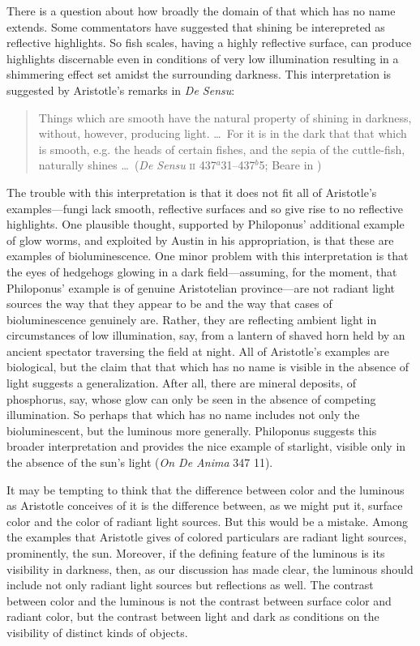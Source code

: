 There is a question about how broadly the domain of that which has no name extends. Some commentators have suggested that shining be interepreted as reflective highlights. So fish scales, having a highly reflective surface, can produce highlights discernable even in conditions of very low illumination resulting in a shimmering effect set amidst the surrounding darkness. This interpretation is suggested by Aristotle's remarks in \emph{De Sensu}: 
\begin{quote}
	Things which are smooth have the natural property of shining in darkness, without, however, producing light. \ldots\ For it is in the dark that that which is smooth, e.g. the heads of certain fishes, and the sepia of the cuttle-fish, naturally shines \ldots\ (\emph{De Sensu} \textsc{ii} 437\( ^{a} \)31--437\( ^{b} \)5; Beare in \citealt[4]{Barnes:1984uq})
\end{quote}
The trouble with this interpretation is that it does not fit all of Aristotle's examples---fungi lack smooth, reflective surfaces and so give rise to no reflective highlights. One plausible thought, supported by Philoponus' additional example of glow worms, and exploited by Austin in his appropriation, is that these are examples of bioluminescence. One minor problem with this interpretation is that the eyes of hedgehogs glowing in a dark field---assuming, for the moment, that Philoponus' example is of genuine Aristotelian province---are not radiant light sources the way that they appear to be and the way that cases of  bioluminescence genuinely are. Rather, they are reflecting ambient light in circumstances of low illumination, say, from a lantern of shaved horn held by an ancient spectator traversing the field at night. All of Aristotle's examples are biological, but the claim that that which has no name is visible in the absence of light suggests a generalization. After all, there are mineral deposits, of phosphorus, say, whose glow can only be seen in the absence of competing illumination. So perhaps that which has no name includes not only the bioluminescent, but the luminous more generally. Philoponus suggests this broader interpretation and provides the nice example of starlight, visible only in the absence of the sun's light (\emph{On \emph{De Anima}} 347 11). 

It may be tempting to think that the difference between color and the luminous as Aristotle conceives of it is the difference between, as we might put it, surface color and the color of radiant light sources. But this would be a mistake. Among the examples that Aristotle gives of colored particulars are radiant light sources, prominently, the sun. Moreover, if the defining feature of the luminous is its visibility in darkness, then, as our discussion has made clear, the luminous should include not only radiant light sources but reflections as well. The contrast between color and the luminous is not the contrast between surface color and radiant color, but the contrast between light and dark as conditions on the visibility of distinct kinds of objects.

